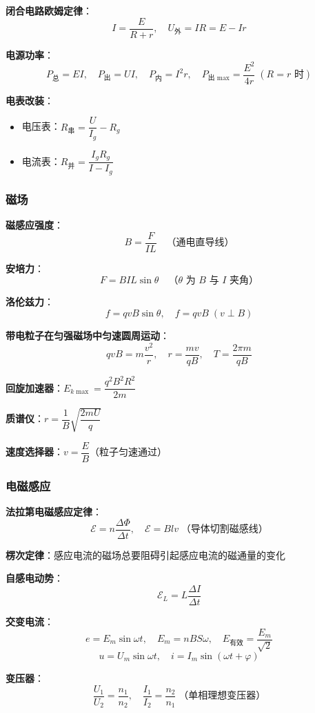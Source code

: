 \textbf{闭合电路欧姆定律}：
\[
I = \frac{E}{R+r},\quad
U_{\text{外}} = IR = E - Ir
\]

\textbf{电源功率}：
\[
P_{\text{总}} = EI,\quad
P_{\text{出}} = UI,\quad
P_{\text{内}} = I^2r,\quad
P_{\text{出 max}} = \frac{E^2}{4r}\;(R=r\text{ 时})
\]

\textbf{电表改装}：
\begin{itemize}
  \item 电压表：$R_{\text{串}} = \dfrac{U}{I_g} - R_g$
  \item 电流表：$R_{\text{并}} = \dfrac{I_gR_g}{I - I_g}$
\end{itemize}

\subsubsection{磁场}

\textbf{磁感应强度}：
\[
B = \frac{F}{IL}\quad\text{（通电直导线）}
\]

\textbf{安培力}：
\[
F = BIL\sin\theta\quad\text{（$\theta$ 为 $B$ 与 $I$ 夹角）}
\]

\textbf{洛伦兹力}：
\[
f = qvB\sin\theta,\quad
f = qvB\;(v\perp B)
\]

\textbf{带电粒子在匀强磁场中匀速圆周运动}：
\[
qvB = m\frac{v^2}{r},\quad
r = \frac{mv}{qB},\quad
T = \frac{2\pi m}{qB}
\]

\textbf{回旋加速器}：$E_{k\max} = \dfrac{q^2B^2R^2}{2m}$

\textbf{质谱仪}：$r = \dfrac{1}{B}\sqrt{\dfrac{2mU}{q}}$

\textbf{速度选择器}：$v = \dfrac{E}{B}$（粒子匀速通过）

\subsubsection{电磁感应}

\textbf{法拉第电磁感应定律}：
\[
\mathcal{E} = n\frac{\Delta\Phi}{\Delta t},\quad
\mathcal{E} = Blv\;\text{（导体切割磁感线）}
\]

\textbf{楞次定律}：感应电流的磁场总要阻碍引起感应电流的磁通量的变化

\textbf{自感电动势}：
\[
\mathcal{E}_L = L\frac{\Delta I}{\Delta t}
\]

\textbf{交变电流}：
\[
e = E_m\sin\omega t,\quad
E_m = nBS\omega,\quad
E_{\text{有效}} = \frac{E_m}{\sqrt{2}}
\]
\[
u = U_m\sin\omega t,\quad
i = I_m\sin(\omega t+\varphi)
\]

\textbf{变压器}：
\[
\frac{U_1}{U_2} = \frac{n_1}{n_2},\quad
\frac{I_1}{I_2} = \frac{n_2}{n_1}\;\text{（单相理想变压器）}
\]

